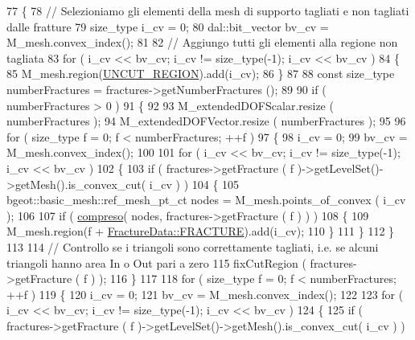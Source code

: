 \begin{DoxyCode}
77 \{
78     \textcolor{comment}{// Selezioniamo gli elementi della mesh di supporto tagliati e non tagliati dalle fratture}
79     size\_type i\_cv = 0;
80     dal::bit\_vector bv\_cv = M\_mesh.convex\_index();
81 
82     \textcolor{comment}{// Aggiungo tutti gli elementi alla regione non tagliata}
83     \textcolor{keywordflow}{for} ( i\_cv << bv\_cv; i\_cv != size\_type(-1); i\_cv << bv\_cv )
84     \{
85         M\_mesh.region(\hyperlink{classMeshHandler_a239707613811024a58eece39a4c9bab3afc8bd5152d6d9b425b5e8bf4da8bd617}{UNCUT\_REGION}).add(i\_cv);
86     \}
87 
88     \textcolor{keyword}{const} size\_type numberFractures = fractures->getNumberFractures ();
89 
90     \textcolor{keywordflow}{if} ( numberFractures > 0 )
91     \{
92 
93         M\_extendedDOFScalar.resize ( numberFractures );
94         M\_extendedDOFVector.resize ( numberFractures );
95 
96         \textcolor{keywordflow}{for} ( size\_type f = 0; f < numberFractures; ++f )
97         \{
98             i\_cv = 0;
99             bv\_cv = M\_mesh.convex\_index();
100 
101             \textcolor{keywordflow}{for} ( i\_cv << bv\_cv; i\_cv != size\_type(-1); i\_cv << bv\_cv )
102             \{
103                 \textcolor{keywordflow}{if} ( fractures->getFracture ( f )->getLevelSet()->getMesh().is\_convex\_cut( i\_cv ) )
104                 \{
105                     bgeot::basic\_mesh::ref\_mesh\_pt\_ct nodes = M\_mesh.points\_of\_convex ( i\_cv );
106 
107                     \textcolor{keywordflow}{if} ( \hyperlink{classMeshHandler_a3c8a354d214222155cb4eecf8214c938}{compreso}( nodes, fractures->getFracture ( f ) ) )
108                     \{
109                                 M\_mesh.region(f + \hyperlink{classFractureData_aaeea1f30482432d159eda9d98beb5e89a351538e4c78b34b5c0416e21903e1812}{FractureData::FRACTURE}).add(i\_cv);
110                     \}
111                 \}
112             \}
113 
114             \textcolor{comment}{// Controllo se i triangoli sono correttamente tagliati, i.e. se alcuni triangoli hanno area In
       o Out pari a zero}
115             fixCutRegion ( fractures->getFracture ( f ) );
116         \}
117 
118         \textcolor{keywordflow}{for} ( size\_type f = 0; f < numberFractures; ++f )
119         \{
120             i\_cv = 0;
121             bv\_cv = M\_mesh.convex\_index();
122             
123             \textcolor{keywordflow}{for} ( i\_cv << bv\_cv; i\_cv != size\_type(-1); i\_cv << bv\_cv )
124             \{
125                 \textcolor{keywordflow}{if} ( fractures->getFracture ( f )->getLevelSet()->getMesh().is\_convex\_cut( i\_cv ) )

\end{DoxyCode}
